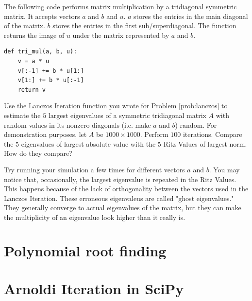 \begin{problem}
The following code performs matrix multiplication by a tridiagonal symmetric matrix.
It accepts vectors $a$ and $b$ and $u$.
$a$ stores the entries in the main diagonal of the matrix.
$b$ stores the entries in the first sub/superdiagonal.
The function returns the image of $u$ under the matrix represented by $a$ and $b$.

\begin{lstlisting}
def tri_mul(a, b, u):
    v = a * u
    v[:-1] += b * u[1:]
    v[1:] += b * u[:-1]
    return v
\end{lstlisting}

Use the Lanczos Iteration function you wrote for Problem \ref{prob:lanczos} to estimate the $5$ largest eigenvalues of a symmetric tridiagonal matrix $A$ with random values in its nonzero diagonals (i.e. make $a$ and $b$) random.
For demonstration purposes, let $A$ be $1000 \times 1000$.
Perform $100$ iterations.
Compare the $5$ eigenvalues of largest absolute value with the $5$ Ritz Values of largest norm.
How do they compare?

Try running your simulation a few times for different vectors $a$ and $b$.
You may notice that, occasionally, the largest eigenvalue is repeated in the Ritz Values.
This happens because of the lack of orthogonality between the vectors used in the Lanczos Iteration.
These erroneous eigenvaleus are called "ghost eigenvalues."
They generally converge to actual eigenvalues of the matrix, but they can make the multiplicity of an eigenvalue look higher than it really is.
\end{problem}

\section*{Polynomial root finding}



\section*{Arnoldi Iteration in SciPy}









